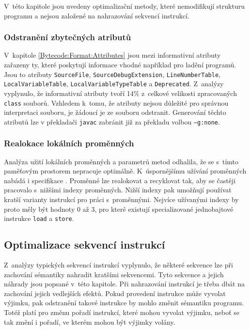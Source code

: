 V~této kapitole jsou uvedeny optimalizační metody, které nemodifikují strukturu programu a nejsou založené na nahrazování sekvencí instrukcí.


\subsubsection{Odstranění zbytečných atributů}
V~kapitole \ref{Bytecode:Format:Attributes} jsou mezi informativní atributy zařazeny ty, které poskytují informace vhodné například pro ladění programů. Jsou to atributy \texttt{SourceFile}, \texttt{SourceDebugExtension}, \texttt{LineNumberTable}, \texttt{LocalVariableTable}, \texttt{LocalVariableTypeTable} a \texttt{Deprecated}.  Z~analýzy vyplynulo, že informativní atributy tvoří 14\% z~celkové velikosti zpracovaných \texttt{class} souborů. Vzhledem k~tomu, že atributy nejsou důležité pro správnou interpretaci souboru, je žádoucí je ze souboru odstranit. Generování těchto atributů lze v překladači \texttt{javac} zabránit již za překladu volbou \texttt{--g:none}.

\subsubsection{Realokace lokálních proměnných}
Analýza užití lokálních proměnných a parametrů metod odhalila, že se s~tímto paměťovým prostorem nepracuje optimálně. K~úspornějšímu užívání proměnných nabádá i specifikace \cite{Lindholm:JVM}. Proměnné lze realokovat a recyklovat tak, aby se častěji pracovalo s~nižšími indexy proměnných. Nižší indexy pak umožňují používat kratší varianty instrukcí pro práci s~proměnnými. Nejvíce užívanými indexy by proto měly být hodnoty 0 až 3, pro které existují specializované jednobajtové instrukce \texttt{load} a \texttt{store}. 


\subsection{Optimalizace sekvencí instrukcí}

Z~analýzy typických sekvencí instrukcí vyplynulo, že některé sekvence lze při zachování sémantiky nahradit kratšími sekvencemi.
Tyto sekvence a jejich náhrady jsou popsané v~této kapitole.
Při nahrazování instrukcí je třeba dbát na zachování jejich vedlejších efektů. Pokud provedení instrukce může vyvolat výjimku, pak odstranění takové instrukce by mohlo změnit sémantiku programu. Totéž platí pro změnu pořadí instrukcí, které mohou vyvolat výjimku, neboť se tak změní i pořadí, ve kterém mohou být výjimky volány.

